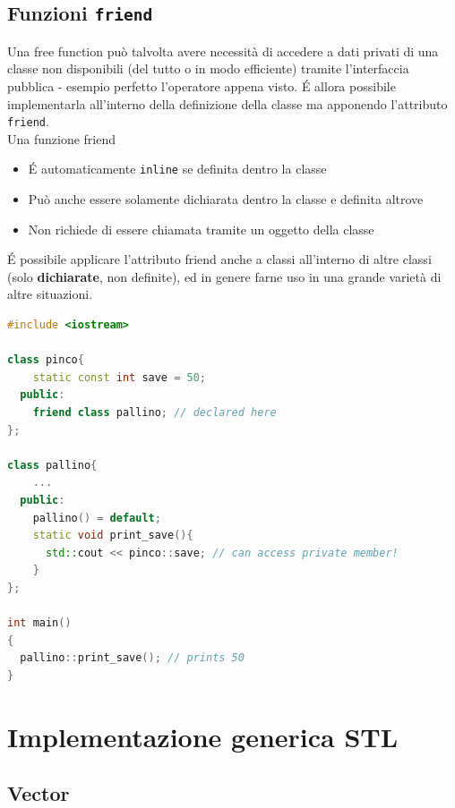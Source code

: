 \documentclass[10pt, oneside]{book}
\begin{document}
\section{Funzioni \texttt{friend}}
Una free function può talvolta avere necessità di accedere a dati privati di una classe non disponibili (del tutto o in modo efficiente) tramite l'interfaccia pubblica - esempio perfetto l'operatore appena visto. \'E allora possibile implementarla all'interno della definizione della classe ma apponendo l'attributo \texttt{friend}.\\
Una funzione friend
\begin{itemize}
\item \'E automaticamente \texttt{inline} se definita dentro la classe
\item Può anche essere solamente dichiarata dentro la classe e definita altrove
\item Non richiede di essere chiamata tramite un oggetto della classe
\end{itemize}
\'E possibile applicare l'attributo friend anche a classi all'interno di altre classi (solo \textbf{dichiarate}, non definite), ed in genere farne uso in una grande varietà di altre situazioni.
\begin{lstlisting}[language=C++]
#include <iostream>

class pinco{
    static const int save = 50;
  public:
    friend class pallino; // declared here
};

class pallino{
    ...
  public:
    pallino() = default;
    static void print_save(){
      std::cout << pinco::save; // can access private member!
    }
};

int main()
{
  pallino::print_save(); // prints 50
}
\end{lstlisting}

\chapter{Implementazione generica STL}
\section{Vector}
\end{document}
